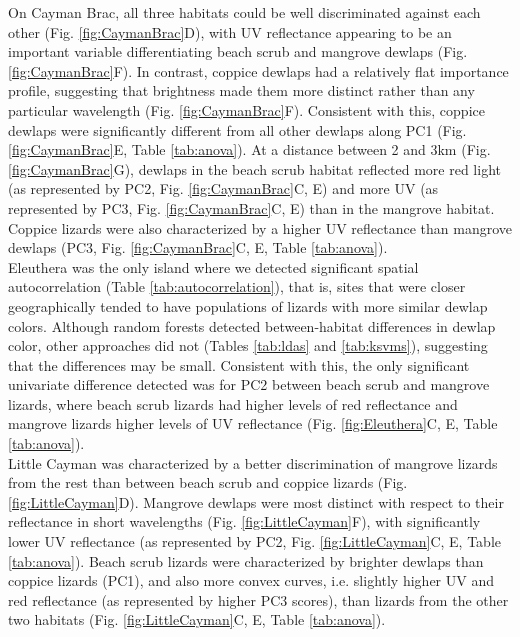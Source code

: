 On Cayman Brac, all three habitats could be well discriminated against each other (Fig. \ref{fig:CaymanBrac}D), with UV reflectance appearing to be an important variable differentiating beach scrub and mangrove dewlaps (Fig. \ref{fig:CaymanBrac}F). In contrast, coppice dewlaps had a relatively flat importance profile, suggesting that brightness made them more distinct rather than any particular wavelength (Fig. \ref{fig:CaymanBrac}F). Consistent with this, coppice dewlaps were significantly different from all other dewlaps along PC1 (Fig. \ref{fig:CaymanBrac}E, Table \ref{tab:anova}). At a distance between 2 and 3km (Fig. \ref{fig:CaymanBrac}G), dewlaps in the beach scrub habitat reflected more red light (as represented by PC2, Fig. \ref{fig:CaymanBrac}C, E) and more UV (as represented by PC3, Fig. \ref{fig:CaymanBrac}C, E) than in the mangrove habitat. Coppice lizards were also characterized by a higher UV reflectance than mangrove dewlaps (PC3, Fig. \ref{fig:CaymanBrac}C, E, Table \ref{tab:anova}).\\

Eleuthera was the only island where we detected significant spatial autocorrelation (Table \ref{tab:autocorrelation}), that is, sites that were closer geographically tended to have populations of lizards with more similar dewlap colors. Although random forests detected between-habitat differences in dewlap color, other approaches did not (Tables \ref{tab:ldas} and \ref{tab:ksvms}), suggesting that the differences may be small. Consistent with this, the only significant univariate difference detected was for PC2 between beach scrub and mangrove lizards, where beach scrub lizards had higher levels of red reflectance and mangrove lizards higher levels of UV reflectance (Fig. \ref{fig:Eleuthera}C, E, Table \ref{tab:anova}).\\

Little Cayman was characterized by a better discrimination of mangrove lizards from the rest than between beach scrub and coppice lizards (Fig. \ref{fig:LittleCayman}D). Mangrove dewlaps were most distinct with respect to their reflectance in short wavelengths (Fig. \ref{fig:LittleCayman}F), with significantly lower UV reflectance (as represented by PC2, Fig. \ref{fig:LittleCayman}C, E, Table \ref{tab:anova}). Beach scrub lizards were characterized by brighter dewlaps than coppice lizards (PC1), and also more convex curves, i.e. slightly higher UV and red reflectance (as represented by higher PC3 scores), than lizards from the other two habitats (Fig. \ref{fig:LittleCayman}C, E, Table \ref{tab:anova}).\\

